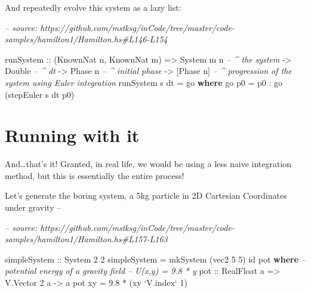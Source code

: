 \documentclass[]{article}
\newenvironment{Shaded}{}{}
\newcommand{\CommentTok}[1]{\textcolor[rgb]{0.38,0.63,0.69}{\textit{#1}}}
\newcommand{\DataTypeTok}[1]{\textcolor[rgb]{0.56,0.13,0.00}{#1}}
\newcommand{\DecValTok}[1]{\textcolor[rgb]{0.25,0.63,0.44}{#1}}
\newcommand{\FloatTok}[1]{\textcolor[rgb]{0.25,0.63,0.44}{#1}}
\newcommand{\FunctionTok}[1]{\textcolor[rgb]{0.02,0.16,0.49}{#1}}
\newcommand{\KeywordTok}[1]{\textcolor[rgb]{0.00,0.44,0.13}{\textbf{#1}}}
\newcommand{\NormalTok}[1]{#1}
\newcommand{\OtherTok}[1]{\textcolor[rgb]{0.00,0.44,0.13}{#1}}
\begin{document}
And repeatedly evolve this system as a lazy list:

\begin{Shaded}
\begin{Highlighting}[]
\CommentTok{-- source: https://github.com/mstksg/inCode/tree/master/code-samples/hamilton1/Hamilton.hs#L146-L154}

\NormalTok{runSystem}
\OtherTok{    ::}\NormalTok{ (}\DataTypeTok{KnownNat}\NormalTok{ n, }\DataTypeTok{KnownNat}\NormalTok{ m)}
    \OtherTok{=>} \DataTypeTok{System}\NormalTok{ m n       }\CommentTok{-- ^ the system}
    \OtherTok{->} \DataTypeTok{Double}           \CommentTok{-- ^ dt}
    \OtherTok{->} \DataTypeTok{Phase}\NormalTok{ n          }\CommentTok{-- ^ initial phase}
    \OtherTok{->}\NormalTok{ [}\DataTypeTok{Phase}\NormalTok{ n]        }\CommentTok{-- ^ progression of the system using Euler integration}
\NormalTok{runSystem s dt }\FunctionTok{=}\NormalTok{ go}
  \KeywordTok{where}
\NormalTok{    go p0 }\FunctionTok{=}\NormalTok{ p0 }\FunctionTok{:}\NormalTok{ go (stepEuler s dt p0)}
\end{Highlighting}
\end{Shaded}

\hypertarget{running-with-it}{%
\section{Running with it}\label{running-with-it}}

And\ldots{}that's it! Granted, in real life, we would be using a less naive
integration method, but this is essentially the entire process!

Let's generate the boring system, a 5kg particle in 2D Cartesian Coordinates
under gravity --

\begin{Shaded}
\begin{Highlighting}[]
\CommentTok{-- source: https://github.com/mstksg/inCode/tree/master/code-samples/hamilton1/Hamilton.hs#L157-L163}

\OtherTok{simpleSystem ::} \DataTypeTok{System} \DecValTok{2} \DecValTok{2}
\NormalTok{simpleSystem }\FunctionTok{=}\NormalTok{ mkSystem (vec2 }\DecValTok{5} \DecValTok{5}\NormalTok{) id pot}
  \KeywordTok{where}
    \CommentTok{-- potential energy of a gravity field}
    \CommentTok{-- U(x,y) = 9.8 * y}
\OtherTok{    pot ::} \DataTypeTok{RealFloat}\NormalTok{ a }\OtherTok{=>} \DataTypeTok{V.Vector} \DecValTok{2}\NormalTok{ a }\OtherTok{->}\NormalTok{ a}
\NormalTok{    pot xy }\FunctionTok{=} \FloatTok{9.8} \FunctionTok{*}\NormalTok{ (xy }\OtherTok{`V.index`} \DecValTok{1}\NormalTok{)}
\end{Highlighting}
\end{Shaded}
\end{document}
